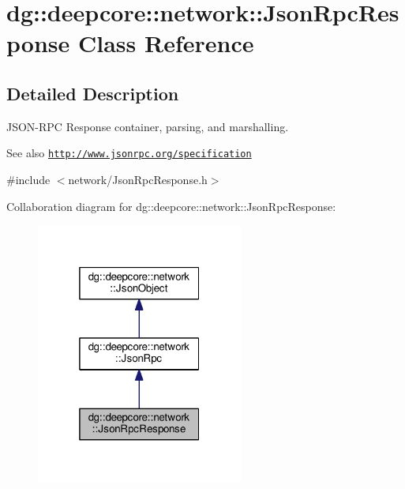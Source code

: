 \hypertarget{classdg_1_1deepcore_1_1network_1_1_json_rpc_response}{}\section{dg\+:\+:deepcore\+:\+:network\+:\+:Json\+Rpc\+Response Class Reference}
\label{classdg_1_1deepcore_1_1network_1_1_json_rpc_response}


\subsection{Detailed Description}
J\+S\+O\+N-\/\+R\+PC Response container, parsing, and marshalling. 

\begin{DoxySeeAlso}{See also}
\href{http://www.jsonrpc.org/specification}{\tt http\+://www.\+jsonrpc.\+org/specification} 
\end{DoxySeeAlso}


{\ttfamily \#include $<$network/\+Json\+Rpc\+Response.\+h$>$}



Collaboration diagram for dg\+:\+:deepcore\+:\+:network\+:\+:Json\+Rpc\+Response\+:
\nopagebreak
\begin{figure}[H]
\begin{center}
\leavevmode
\includegraphics[width=193pt]{classdg_1_1deepcore_1_1network_1_1_json_rpc_response__coll__graph}
\end{center}
\end{figure}
